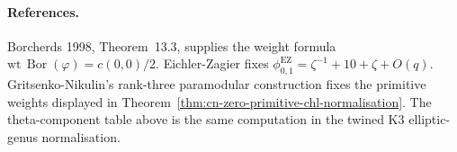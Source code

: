 \paragraph{References.}
Borcherds 1998, Theorem~13.3, supplies the weight formula
\(\mathrm{wt}\,\operatorname{Bor}(\varphi)=c(0,0)/2\).
Eichler-Zagier fixes
\(\phi_{0,1}^{\mathrm{EZ}}=\zeta^{-1}+10+\zeta+O(q)\).
Gritsenko-Nikulin's rank-three paramodular construction fixes the
primitive weights displayed in Theorem~\ref{thm:cn-zero-primitive-chl-normalisation}.
The theta-component table above is the same computation in the
twined K3 elliptic-genus normalisation.
